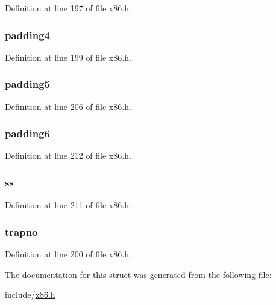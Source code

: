 Definition at line 197 of file x86.\-h.

\hypertarget{structtrapframe_a2b559818ffd02a68e4d5ac320237a025}{
\subsubsection[{padding4}]{ padding4}}\label{structtrapframe_a2b559818ffd02a68e4d5ac320237a025}


Definition at line 199 of file x86.\-h.

\hypertarget{structtrapframe_aa4adb792df4544b351afdded07baba05}{
\subsubsection[{padding5}]{ padding5}}\label{structtrapframe_aa4adb792df4544b351afdded07baba05}


Definition at line 206 of file x86.\-h.

\hypertarget{structtrapframe_a79f9b7c8cb0db73082d203bd85b262b7}{
\subsubsection[{padding6}]{ padding6}}\label{structtrapframe_a79f9b7c8cb0db73082d203bd85b262b7}


Definition at line 212 of file x86.\-h.

\hypertarget{structtrapframe_aa518aeb56634c5237632789fbe00b635}{
\subsubsection[{ss}]{ ss}}\label{structtrapframe_aa518aeb56634c5237632789fbe00b635}


Definition at line 211 of file x86.\-h.

\hypertarget{structtrapframe_ac8d91601c2d3153426c4f2dd2949d359}{
\subsubsection[{trapno}]{ trapno}}\label{structtrapframe_ac8d91601c2d3153426c4f2dd2949d359}


Definition at line 200 of file x86.\-h.



The documentation for this struct was generated from the following file\-:\begin{DoxyCompactItemize}
\item 
include/\hyperlink{x86_8h}{x86.\-h}\end{DoxyCompactItemize}
